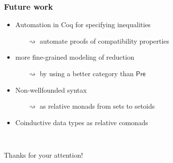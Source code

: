 \documentclass[
serif,
mathsans,
]
{beamer}
\newcommand{\PreOrd}{\mathsf{Pre}}
\begin{document}
\begin{frame}
\frametitle{Future work}

 \begin{itemize}\setlength{\itemsep}{1.2em}
  \item Automation in Coq for specifying inequalities
    \begin{itemize}
       \item [$\rightsquigarrow$] automate proofs of compatibility properties
    \end{itemize}
  \item more fine-grained modeling of reduction
      \begin{itemize}
       \item [$\rightsquigarrow$] by using a better category than $\PreOrd$
    \end{itemize}
  \item Non-wellfounded syntax 
    \begin{itemize}
       \item [$\rightsquigarrow$] as relative monads from sets to setoids
    \end{itemize}
  \item Coinductive data types as relative comonads
 \end{itemize}



\pause

 ~ \\

 
 \begin{center}
Thanks for your attention!
 \end{center}
 
\end{frame}
\end{document}
